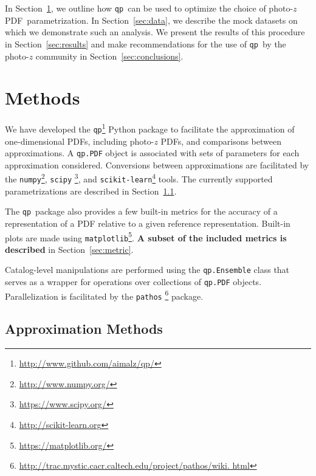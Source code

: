 \documentclass[\docopts]{\docclass}
\newcommand{\qp}{\texttt{qp}}
\newcommand{\pz}{photo-$z$ PDF}
\begin{document}
In Section~\ref{sec:methods}, we outline how \qp\ can be used to optimize the 
choice of \pz\ parametrization.
In Section~\ref{sec:data}, we describe the mock datasets on which we 
demonstrate such an analysis.
We present the results of this procedure in Section~\ref{sec:results} and make 
recommendations for the use of \qp\ by the photo-$z$ community in 
Section~\ref{sec:conclusions}.

\section{Methods}
\label{sec:methods}


We have developed the \qp\footnote{\url{http://www.github.com/aimalz/qp/}} 
Python package to facilitate the approximation of one-dimensional PDFs, 
including \pz s, and comparisons between approximations.
A \texttt{qp.PDF} object is associated with sets of parameters for each 
approximation considered.
Conversions between approximations are facilitated by the 
\texttt{numpy}\footnote{\url{http://www.numpy.org/}}, \texttt{scipy} 
\footnote{\url{https://www.scipy.org/}}, and 
\texttt{scikit-learn}\footnote{\url{http://scikit-learn.org}} 
\citep{pedregosa_scikit-learn:_2011} tools.
The currently supported parametrizations are described in 
Section~\ref{sec:approx}.

The \qp\ package also provides a few built-in metrics for the accuracy of a 
representation of a PDF relative to a given reference representation.
Built-in plots are made using 
\texttt{matplotlib}\footnote{\url{https://matplotlib.org/}}.
\textbf{A subset of the included metrics is described} in 
Section~\ref{sec:metric}.

Catalog-level manipulations are performed using the \texttt{qp.Ensemble} class 
that serves as a wrapper for operations over collections of \texttt{qp.PDF} 
objects.
Parallelization is facilitated by the \texttt{pathos} 
\footnote{\noindent\url{http://trac.mystic.cacr.caltech.edu/project/pathos/wiki.
html}} \citep{mckerns_building_2012, mckerns_pathos:_2010} package.

\subsection{Approximation Methods}
\label{sec:approx}
\end{document}
